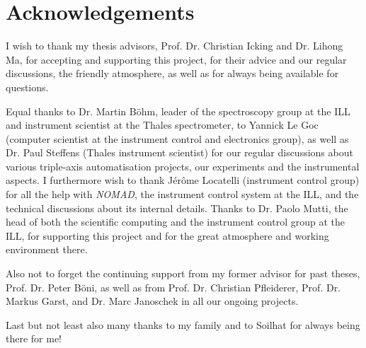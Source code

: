 %
%

\chapter*{Acknowledgements}

I wish to thank my thesis advisors, Prof. Dr. Christian Icking and Dr. Lihong Ma, for accepting 
and supporting this project, for their advice and our regular discussions, the friendly atmosphere, 
as well as for always being available for questions.

Equal thanks to Dr. Martin B\"ohm, leader of the spectroscopy group at the ILL and instrument 
scientist at the Thales spectrometer, to Yannick Le Goc (computer scientist at the instrument 
control and electronics group), as well as Dr. Paul Steffens (Thales instrument scientist) for our 
regular discussions about various triple-axis automatisation projects, our experiments and the
instrumental aspects. I furthermore wish to thank Jérôme Locatelli (instrument control group) for
all the help with \textit{NOMAD}, the instrument control system at the ILL, and the technical discussions
about its internal details. 
Thanks to Dr. Paolo Mutti, the head of both the scientific computing and the instrument control group 
at the ILL, for supporting this project and for the great atmosphere and working environment there.

Also not to forget the continuing support from my former advisor for past theses, Prof. Dr. Peter B\"oni,
as well as from Prof. Dr. Christian Pfleiderer, Prof. Dr. Markus Garst, and Dr. Marc Janoschek in all our ongoing projects.

Last but not least also many thanks to my family and to Soilhat for always being there for me!
